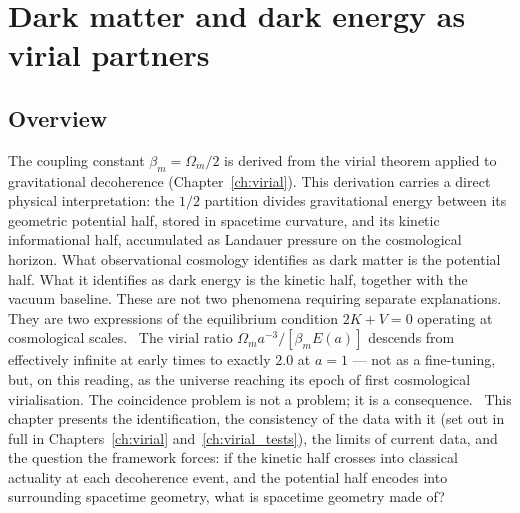 
\chapter{Dark matter and dark energy as virial partners}\label{ch:virial_partners}

\section*{Overview}
The coupling constant $\beta_m=\Omega_m/2$ is derived from the virial theorem applied to gravitational decoherence (Chapter~\ref{ch:virial}). This
derivation carries a direct physical interpretation: the $1/2$ partition divides gravitational energy between its geometric potential half, stored in
spacetime curvature, and its kinetic informational half, accumulated as Landauer pressure on the cosmological horizon. What observational cosmology
identifies as dark matter is the potential half. What it identifies as dark energy is the kinetic half, together with the vacuum baseline. These are not two
phenomena requiring separate explanations. They are two expressions of the equilibrium condition $2K+V=0$ operating at cosmological scales.
\conjecture\ The virial ratio $\Omega_ma^{-3}/[\beta_mE(a)]$ descends from effectively infinite at early times to exactly $2.0$ at $a=1$ --- not as a
fine-tuning, but, on this reading, as the universe reaching its epoch of first cosmological virialisation. The coincidence problem is not a problem; it is a
consequence. \interp\ This chapter presents the identification, the consistency of the data with it (set out in full in Chapters~\ref{ch:virial}
and~\ref{ch:virial_tests}), the limits of current data, and the question the framework forces: if the kinetic half crosses into classical actuality at each
decoherence event, and the potential half encodes into surrounding spacetime geometry, what is spacetime geometry made of?

